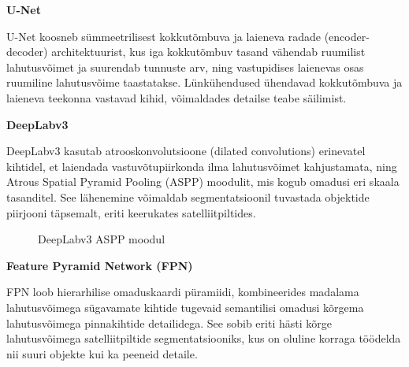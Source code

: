 \textbf{U-Net}

U-Net koosneb sümmeetrilisest kokkutõmbuva ja laieneva radade (encoder-decoder) architektuurist, kus iga kokkutõmbuv tasand vähendab ruumilist lahutusvõimet ja suurendab tunnuste arv, ning vastupidises laienevas osas ruumiline lahutusvõime taastatakse. Lünkühendused ühendavad kokkutõmbuva ja laieneva teekonna vastavad kihid, võimaldades detailse teabe säilimist.



\textbf{DeepLabv3}

DeepLabv3 kasutab atrooskonvolutsioone (dilated convolutions) erinevatel kihtidel, et laiendada vastuvõtupiirkonda ilma lahutusvõimet kahjustamata, ning Atrous Spatial Pyramid Pooling (ASPP) moodulit, mis kogub omadusi eri skaala tasanditel. See lähenemine võimaldab segmentatsioonil tuvastada objektide piirjooni täpsemalt, eriti keerukates satelliitpiltides.

\begin{figure}[!ht]
    \centering
    \caption{DeepLabv3 ASPP moodul}
    \label{fig:DeepLabv3ASPP}
\end{figure}


\textbf{Feature Pyramid Network (FPN)}

FPN loob hierarhilise omaduskaardi püramiidi, kombineerides madalama lahutusvõimega sügavamate kihtide tugevaid semantilisi omadusi kõrgema lahutusvõimega pinnakihtide detailidega. See sobib eriti hästi kõrge lahutusvõimega satelliitpiltide segmentatsiooniks, kus on oluline korraga töödelda nii suuri objekte kui ka peeneid detaile.

